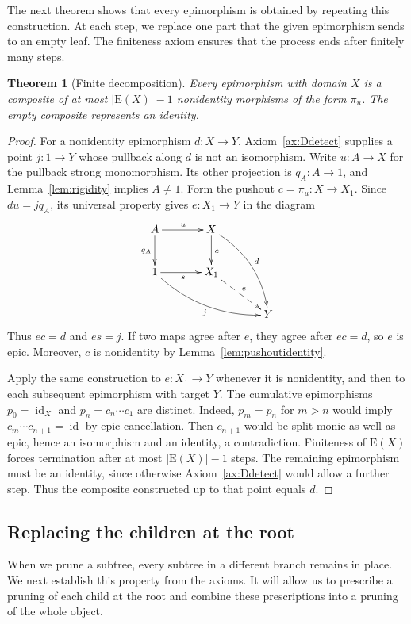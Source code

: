 \documentclass[11pt,a4paper]{article}
\theoremstyle{plain}
\newtheorem{theorem}{Theorem}[section]
\theoremstyle{definition}
\theoremstyle{remark}
\newcommand{\one}{1}
\newcommand{\id}{\operatorname{id}}
\newcommand{\Out}{\mathrm{E}}
\begin{document}
The next theorem shows that every epimorphism is obtained by
repeating this construction. At each step, we replace one part
that the given epimorphism sends to an empty leaf. The finiteness
axiom ensures that the process ends after finitely many steps.

\begin{theorem}[Finite decomposition]\label{thm:finitegeneration}
Every epimorphism with domain $X$ is a composite of at most
$|\Out(X)|-1$ nonidentity morphisms of the form $\pi_u$. The empty composite
represents an identity.
\end{theorem}
\begin{proof}
For a nonidentity epimorphism $d:X\to Y$, Axiom~\ref{ax:Ddetect}
supplies a point $j:\one\to Y$ whose pullback along $d$ is
not an isomorphism. Write $u:A\to X$ for the pullback strong
monomorphism. Its other projection is $q_A:A\to\one$, and
Lemma~\ref{lem:rigidity} implies $A\ne\one$. Form the pushout
$c=\pi_u:X\to X_1$. Since $du=jq_A$, its universal property gives
$e:X_1\to Y$ in the diagram
\[
 \xymatrix@C=3.5em@R=2.5em{
A\ar[r]^u\ar[d]_{q_A}&X\ar[d]^c\ar@/^1pc/[ddr]^d&\\
 \one\ar[r]_s\ar@/_1pc/[drr]_j&X_1\ar@{-->}[dr]^e&\\
 &&Y
 }
\]
Thus $ec=d$ and $es=j$. If two maps agree after $e$, they agree
after $ec=d$, so $e$ is epic. Moreover, $c$ is nonidentity by
Lemma~\ref{lem:pushoutidentity}.

Apply the same construction to $e:X_1\to Y$ whenever it is
nonidentity, and then to each subsequent epimorphism with target $Y$.
The cumulative epimorphisms $p_0=\id_X$ and $p_n=c_n\cdots c_1$
are distinct. Indeed, $p_m=p_n$ for $m>n$ would imply
$c_m\cdots c_{n+1}=\id$ by epic cancellation. Then $c_{n+1}$
would be split monic as well as epic, hence an isomorphism and
an identity, a contradiction. Finiteness of $\Out(X)$ forces
termination after at most $|\Out(X)|-1$ steps. The remaining
epimorphism must be an identity, since otherwise
Axiom~\ref{ax:Ddetect} would allow a further step. Thus the
composite constructed up to that point equals $d$.
\end{proof}

\subsection{Replacing the children at the root}\label{sec:component-pruning}
When we prune a subtree, every subtree in a different branch
remains in place. We next establish this property from the
axioms. It will allow us to prescribe a pruning of each child
at the root and combine these prescriptions into a pruning of
the whole object.
\end{document}
